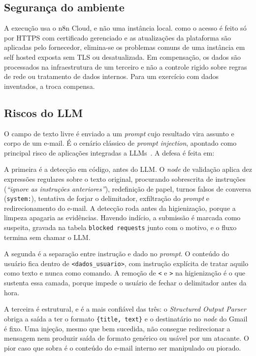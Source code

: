 \documentclass[article,11pt,oneside,a4paper,brazil,section=TITLE]{abntex2}
\begin{document}
\subsection{Segurança do ambiente}

A execução usa o n8n Cloud, e não uma instância local. como o acesso é feito só por HTTPS com certificado gerenciado e as atualizações da plataforma são aplicadas pelo fornecedor, elimina-se os problemas comuns de uma instância em self hosted exposta sem TLS ou desatualizada. Em compensação, os dados são processados na infraestrutura de um terceiro e não a controle rigido sobre regras de rede ou tratamento de dados internos. Para um exercício com dados inventados, a troca compensa.

\subsection{Riscos do LLM}

O campo de texto livre é enviado a um \emph{prompt} cujo resultado vira assunto e corpo de um e-mail. É o cenário clássico de \emph{prompt injection}, apontado como principal risco de aplicações integradas a LLMs~\cite{owasp,greshake2023}. A defesa é feita em:

A primeira é a detecção em código, antes do LLM. O \emph{node} de validação aplica dez expressões regulares sobre o texto original, procurando sobrescrita de instruções (\emph{``ignore as instruções anteriores''}), redefinição de papel, turnos falsos de conversa (\texttt{system:}), tentativa de forjar o delimitador, exfiltração do \emph{prompt} e redirecionamento do e-mail. A detecção roda antes da higienização, porque a limpeza apagaria as evidências. Havendo indício, a submissão é marcada como suspeita, gravada na tabela \texttt{blocked requests} junto com o motivo, e o fluxo termina sem chamar o LLM.

A segunda é a separação entre instrução e dado no \emph{prompt}. O conteúdo do usuário fica dentro de \texttt{<dados\_usuario>}, com instrução explícita de tratar aquilo como texto e nunca como comando. A remoção de \texttt{<} e \texttt{>} na higienização é o que sustenta essa camada, porque impede o usuário de fechar o delimitador antes da hora.

A terceira é estrutural, e é a mais confiável das três: o \emph{Structured Output Parser} obriga a saída a ter o formato \texttt{\{title, text\}} e o destinatário no \emph{node} do Gmail é fixo. Uma injeção, mesmo que bem sucedida, não consegue redirecionar a mensagem nem produzir saída de formato genérico ou usável por um atacante. O pior caso que sobra é o conteúdo do e-mail interno ser manipulado ou piorado.
\end{document}
